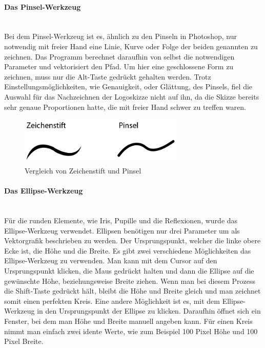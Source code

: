 \paragraph{Das Pinsel-Werkzeug}
\leavevmode \\
Bei dem Pinsel-Werkzeug ist es, ähnlich zu den Pinseln in Photoshop, nur notwendig mit freier Hand eine Linie, Kurve oder Folge der beiden genannten zu zeichnen. Das Programm berechnet daraufhin von selbst die notwendigen Parameter und vektorisiert den Pfad. Um hier eine geschlossene Form zu zeichnen, muss nur die Alt-Taste gedrückt gehalten werden. Trotz Einstellungsmöglichkeiten, wie Genauigkeit, oder Glättung, des Pinsels, fiel die Auswahl für das Nachzeichnen der Logoskizze nicht auf ihn, da die Skizze bereits sehr genaue Proportionen hatte, die mit freier Hand schwer zu treffen waren.\cite{pinsel}
\leavevmode \\

\begin{figure}[H] 
  \centering
     \includegraphics[width=0.7\textwidth]{design_abb2.png}
  \caption{Vergleich von Zeichenstift und Pinsel}
\end{figure}

\paragraph{Das Ellipse-Werkzeug}
\leavevmode \\
Für die runden Elemente, wie Iris, Pupille und die Reflexionen, wurde das Ellipse-Werkzeug verwendet. Ellipsen benötigen nur drei Parameter um als Vektorgrafik beschrieben zu werden. Der Ursprungspunkt, welcher die linke obere Ecke ist, die Höhe und die Breite. Es gibt zwei verschiedene Möglichkeiten das Ellipse-Werkzeug zu verwenden. Man kann mit dem Cursor auf den Ursprungspunkt klicken, die Maus gedrückt halten und dann die Ellipse auf die gewünschte Höhe, beziehungsweise Breite ziehen. Wenn man bei diesem Prozess die Shift-Taste gedrückt hält, bleibt die Höhe und Breite gleich und man zeichnet somit einen perfekten Kreis. Eine andere Möglichkeit ist es, mit dem Ellipse-Werkzeug in den Ursprungspunkt der Ellipse zu klicken. Daraufhin öffnet sich ein Fenster, bei dem man Höhe und Breite manuell angeben kann. Für einen Kreis nimmt man einfach zwei idente Werte, wie zum Beispiel 100 Pixel Höhe und 100 Pixel Breite.\cite{ellipse}
\leavevmode \\

